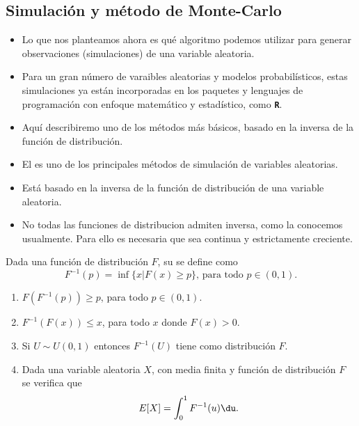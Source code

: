 \subsection{Simulación y método de Monte-Carlo}
\begin{tcolorbox}[colback=blue!5!white, colframe=blue!75!black, title=\textbf{Simulación de variables aleatorias}]
    \begin{itemize}[label=\textbullet, leftmargin=*]
        \item Lo que nos planteamos ahora es qué algoritmo podemos utilizar para generar observaciones (simulaciones) de una variable aleatoria.
        \item Para un gran número de varaibles aleatorias y modelos probabilísticos, estas simulaciones ya están incorporadas en los paquetes y lenguajes de programación con enfoque matemático y estadístico, como \textbf{\texttt{R}}.
        \item Aquí describiremo uno de los métodos más básicos, basado en la inversa de la función de distribución.
        \item El  es uno de los principales métodos de simulación de variables aleatorias.
        \item Está basado en la inversa de la función de distribución de una variable aleatoria.
        \item No todas las funciones de distribucion admiten inversa, como la conocemos usualmente. Para ello es necesaria que sea continua y estrictamente creciente.
        \end{itemize} 
\end{tcolorbox}
\begin{tcolorbox}[colback=blue!5!white, colframe=blue!75!black, title=\textbf{Inversa generalizada de la función de distribución o función cuantil}]
 Dada una función de distribución $F$, su   se define como \[
 F^{-1}(p)=\inf \{x|F(x)\ge p\}\text{, para todo }p\in (0,1). 
 \] 
\end{tcolorbox}
\begin{tcolorbox}[colback=blue!5!white, colframe=blue!75!black, title=\textbf{Propiedades de la función cuantil}]
\begin{enumerate}[label=\arabic*)]
    \item $F(F^{-1}(p))\ge p$, para todo $p \in (0,1)$.
    \item $F^{-1}(F(x))\le x$, para todo $x$ donde  $F(x)>0$.
    \item Si $U\sim U(0,1)$ entonces $F^{-1}(U)$ tiene como distribución $F$.
    \item Dada una variable aleatoria  $X$, con media finita y función de distribución  $F$ se verifica que \[
            E[X]=\int_{0}^{1} F^{-1}(u) \du .
    \] 
\end{enumerate}
\end{tcolorbox}
